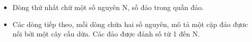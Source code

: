 \begin{itemize}
	\item     Dòng thứ nhất chứ một số nguyên N, số đảo trong quần đảo.   
	\item     Các dòng tiếp theo, mỗi dòng chứa hai số nguyên, mô tả một cặp đảo đựơc nối bởi một cây cầu dừa. Các đảo được đánh số từ 1 đến N.   
\end{itemize}